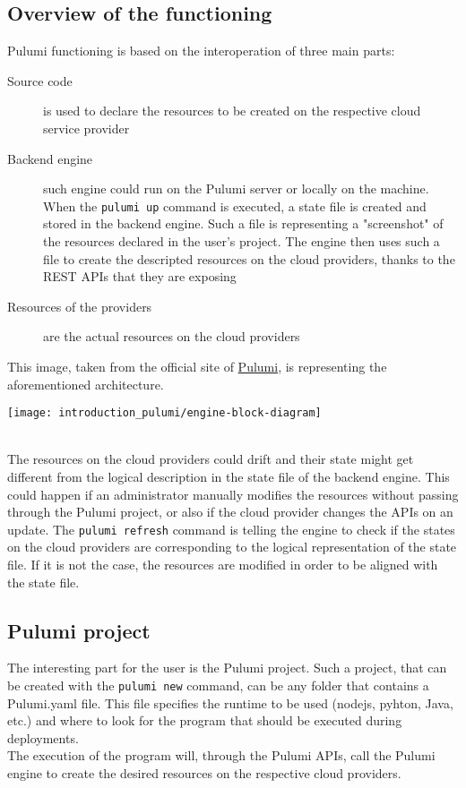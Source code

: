 \subsection{Overview of the functioning}
Pulumi functioning is based on the interoperation of three main parts:
\begin{description}
  \item[Source code] is used to declare the resources to be created on the respective cloud service provider
  \item[Backend engine] such engine could run on the Pulumi server or locally on the machine. When the \texttt{pulumi up} command is executed, a state file is created and stored in the backend engine. Such a file is representing a "screenshot" of the resources declared in the user's project. The engine then uses such a file to create the descripted resources on the cloud providers, thanks to the REST APIs that they are exposing
  \item[Resources of the providers] are the actual resources on the cloud providers
\end{description}
This image, taken from the official site of \href{https://www.pulumi.com/docs/intro/concepts/how-pulumi-works/}{Pulumi}, is representing the aforementioned architecture.
\begin{center}
  \texttt{[image: introduction\_pulumi/engine-block-diagram]} 
\end{center}\mbox{}\\
The resources on the cloud providers could drift and their state might get different from the logical description in the state file of the backend engine.
This could happen if an administrator manually modifies the resources without passing through the Pulumi project, or also if the cloud provider changes the APIs on an update.
The \texttt{pulumi refresh} command is telling the engine to check if the states on the cloud providers are corresponding to the logical representation of the state file.
If it is not the case, the resources are modified in order to be aligned with the state file.


\subsection{Pulumi project}
The interesting part for the user is the Pulumi project.
Such a project, that can be created with the \texttt{pulumi new} command, can be any folder that contains a Pulumi.yaml file.
This file specifies the runtime to be used (nodejs, pyhton, Java, etc.) and where to look for the program that should be executed during deployments.\\
The execution of the program will, through the Pulumi APIs, call the Pulumi engine to create the desired resources on the respective cloud providers.


